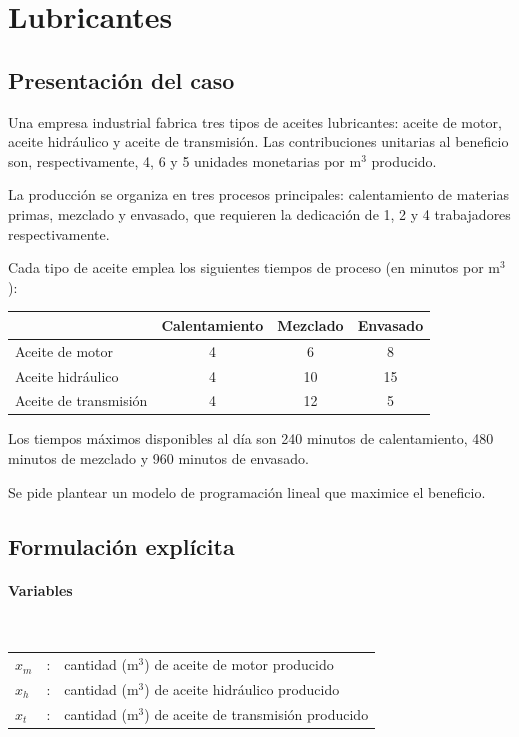 \section{Lubricantes}

\subsection{Presentación del caso}
Una empresa industrial fabrica tres tipos de aceites lubricantes: aceite de motor, aceite hidráulico y aceite de transmisión. 
Las contribuciones unitarias al beneficio son, respectivamente, 4, 6 y 5 unidades monetarias por m$^3$ producido.  

La producción se organiza en tres procesos principales: calentamiento de materias primas, mezclado y envasado, que requieren la dedicación de 1, 2 y 4 trabajadores respectivamente.  

Cada tipo de aceite emplea los siguientes tiempos de proceso (en minutos por m$^3$):

\begin{center}
\begin{tabular}{lccc}
\toprule
 & Calentamiento & Mezclado & Envasado \\
\midrule
Aceite de motor & 4 & 6 & 8 \\
Aceite hidráulico & 4 & 10 & 15 \\
Aceite de transmisión & 4 & 12 & 5 \\
\bottomrule
\end{tabular}
\end{center}

Los tiempos máximos disponibles al día son 240 minutos de calentamiento, 480 minutos de mezclado y 960 minutos de envasado.  

Se pide plantear un modelo de programación lineal que maximice el beneficio.

\subsection{Formulación explícita}

\paragraph{Variables}\mbox{}\\
\begin{tabular}{lcl}
$x_m$ & : & cantidad (m$^3$) de aceite de motor producido \\
$x_h$ & : & cantidad (m$^3$) de aceite hidráulico producido \\
$x_t$ & : & cantidad (m$^3$) de aceite de transmisión producido \\
\end{tabular}

